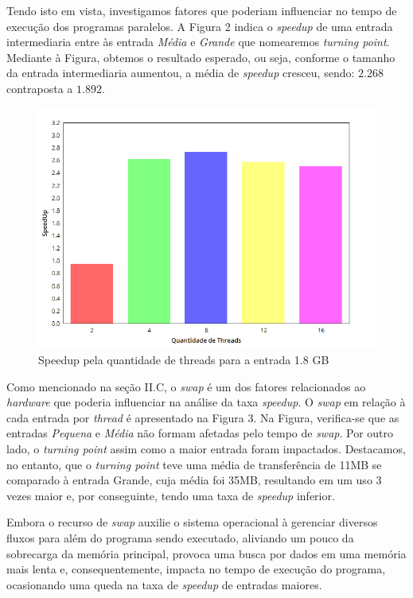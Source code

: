 \documentclass[letterpaper, 10 pt, conference]{ieeeconf}  %
\begin{document}
Tendo isto em vista, investigamos fatores que poderiam influenciar no tempo de execução dos programas paralelos. A Figura 2 indica o \textit{speedup} de uma entrada intermediaria entre às entrada \textit{Média} e \textit{Grande} que nomearemos \textit{turning point}. Mediante à Figura, obtemos o resultado esperado, ou seja, conforme o tamanho da entrada intermediaria aumentou, a média de \textit{speedup} cresceu, sendo: $2.268$ contraposta a $1.892$.
\begin{figure}[thpb]
      \centering
      \includegraphics[scale=0.35]{speedup1.8.png}
      \caption{ Speedup pela quantidade de threads para a entrada 1.8 GB}
      \label{figurelabel2}
   \end{figure}

Como mencionado na seção II.C, o \textit{swap} é um dos fatores relacionados ao \textit{hardware} que poderia influenciar na análise da taxa \textit{speedup}. O \textit{swap} em relação à cada entrada por \textit{thread} é apresentado na Figura 3. Na Figura, verifica-se que as entradas \textit{Pequena} e \textit{Média} não formam afetadas pelo tempo de \textit{swap}. Por outro lado, o \textit{turning point} assim como a maior entrada foram impactados. Destacamos, no entanto, que o \textit{turning point} teve uma média de transferência de 11MB se comparado à entrada Grande, cuja média foi 35MB, resultando em um uso 3 vezes maior e, por conseguinte, tendo uma taxa de \textit{speedup} inferior.

Embora o recurso de \textit{swap} auxilie o sistema operacional à gerenciar diversos fluxos para além do programa sendo executado, aliviando um pouco da sobrecarga da memória principal, provoca uma busca por dados em uma memória mais lenta e, consequentemente, impacta no tempo de execução do programa, ocasionando uma queda na taxa de \textit{speedup} de entradas maiores. 
\end{document}
